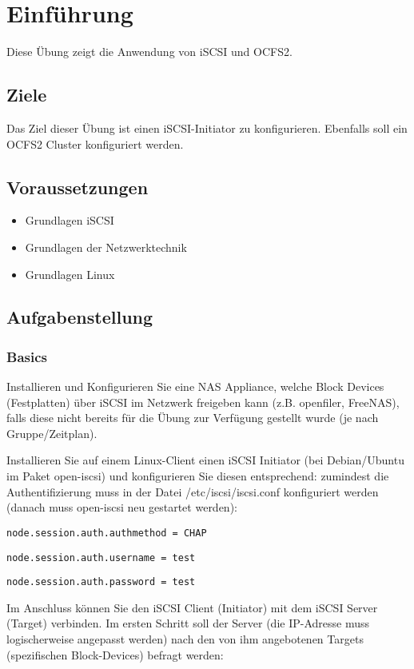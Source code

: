 
\section{Einführung}
Diese Übung zeigt die Anwendung von iSCSI und OCFS2.

\subsection{Ziele}
Das Ziel dieser Übung ist einen iSCSI-Initiator zu konfigurieren. Ebenfalls soll ein OCFS2 Cluster konfiguriert werden. 

\subsection{Voraussetzungen}
\begin{itemize}
	\item Grundlagen iSCSI
	\item Grundlagen der Netzwerktechnik
	\item Grundlagen Linux
\end{itemize}
\subsection{Aufgabenstellung}
\subsubsection{Basics}
Installieren und Konfigurieren Sie eine NAS Appliance, welche Block Devices (Festplatten) über iSCSI im Netzwerk freigeben kann (z.B. openfiler, FreeNAS), falls diese nicht bereits für die Übung zur Verfügung gestellt wurde (je nach Gruppe/Zeitplan).

Installieren Sie auf einem Linux-Client einen iSCSI Initiator (bei Debian/Ubuntu im Paket open-iscsi) und konfigurieren Sie diesen entsprechend: zumindest die Authentifizierung muss in der Datei /etc/iscsi/iscsi.conf konfiguriert werden (danach muss open-iscsi neu gestartet werden):

\texttt{node.session.auth.authmethod = CHAP}

\texttt{node.session.auth.username = test}

\texttt{node.session.auth.password = test}

Im Anschluss können Sie den iSCSI Client (Initiator) mit dem iSCSI Server (Target) verbinden. Im ersten Schritt soll der Server (die IP-Adresse muss logischerweise angepasst werden) nach den von ihm angebotenen Targets (spezifischen Block-Devices) befragt werden:

